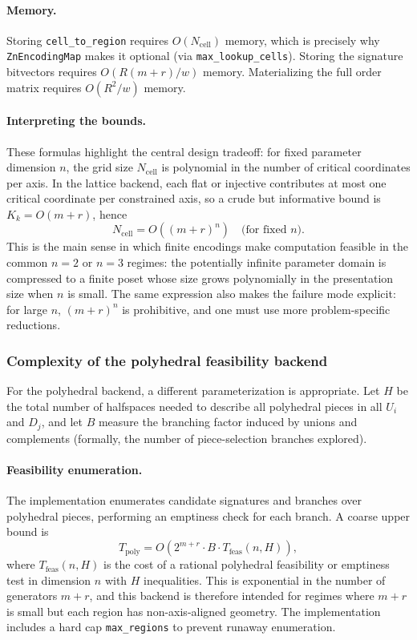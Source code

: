 \documentclass{article}
\newcommand{\<}{\langle}
\renewcommand{\>}{\rangle}
\theoremstyle{definition}
\theoremstyle{remark}
\begin{document}
	\paragraph{Memory.}
	Storing \texttt{cell\_to\_region} requires $O(N_{\mathrm{cell}})$ memory, which is
	precisely why \texttt{ZnEncodingMap} makes it optional (via \texttt{max\_lookup\_cells}).
	Storing the signature bitvectors requires $O(R(m+r)/w)$ memory.  Materializing the
	full order matrix requires $O(R^2/w)$ memory.
	
	\paragraph{Interpreting the bounds.}
	These formulas highlight the central design tradeoff: for fixed parameter dimension $n$,
	the grid size $N_{\mathrm{cell}}$ is polynomial in the number of critical coordinates
	per axis.  In the lattice backend, each flat or injective contributes at most one
	critical coordinate per constrained axis, so a crude but informative bound is
	$K_k = O(m+r)$, hence
	\[
	N_{\mathrm{cell}} = O\!\left((m+r)^n\right)\quad\text{(for fixed $n$)}.
	\]
	This is the main sense in which finite encodings make computation feasible in the
	common $n=2$ or $n=3$ regimes: the potentially infinite parameter domain is compressed
	to a finite poset whose size grows polynomially in the presentation size when $n$ is
	small.  The same expression also makes the failure mode explicit: for large $n$,
	$(m+r)^n$ is prohibitive, and one must use more problem-specific reductions.
	
	\subsubsection*{Complexity of the polyhedral feasibility backend}
	
	For the polyhedral backend, a different parameterization is appropriate.
	Let $H$ be the total number of halfspaces needed to describe all polyhedral pieces
	in all $U_i$ and $D_j$, and let $B$ measure the branching factor induced by unions
	and complements (formally, the number of piece-selection branches explored).
	
	\paragraph{Feasibility enumeration.}
	The implementation enumerates candidate signatures and branches over polyhedral pieces,
	performing an emptiness check for each branch.  A coarse upper bound is
	\[
	T_{\mathrm{poly}} = O\!\left(2^{m+r}\cdot B \cdot T_{\mathrm{feas}}(n,H)\right),
	\]
	where $T_{\mathrm{feas}}(n,H)$ is the cost of a rational polyhedral feasibility or
	emptiness test in dimension $n$ with $H$ inequalities.  This is exponential in the
	number of generators $m+r$, and this backend is therefore intended for regimes where
	$m+r$ is small but each region has non-axis-aligned geometry.  The implementation
	includes a hard cap \texttt{max\_regions} to prevent runaway enumeration.
	
\end{document}
